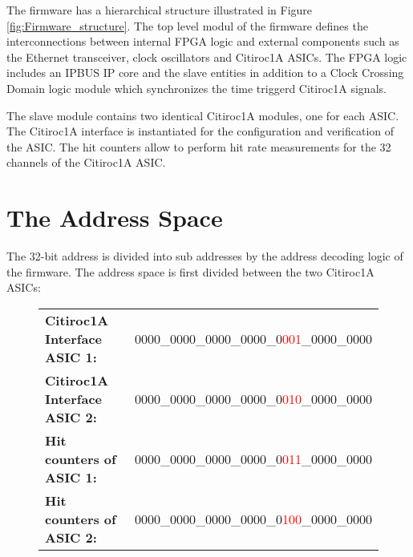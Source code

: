 The firmware has a hierarchical structure illustrated in Figure \ref{fig:Firmware_structure}. 
\newline
The top level modul of the firmware defines the interconnections between internal FPGA logic and external components such as the Ethernet transceiver, clock oscillators and Citiroc1A ASICs.
\newline
The FPGA logic includes an IPBUS IP core and the slave entities in addition to a Clock Crossing Domain logic module which synchronizes the time triggerd Citiroc1A signals. 
\newline

The slave module contains two identical Citiroc1A modules, one for each ASIC. The Citiroc1A interface is instantiated for the configuration and verification of the ASIC.
The hit counters allow to perform hit rate measurements for the 32 channels of the Citiroc1A ASIC. 
\section{The Address Space}
The 32-bit address is divided into sub addresses by the address decoding logic of the firmware.
\newline
The address space is first divided between the two Citiroc1A ASICs:
\begin{figure}[H]
    \centering
\begin{tabular}{p{7cm} l}
    \textbf{Citiroc1A Interface ASIC 1:} & 0000\_0000\_0000\_0000\_0\textcolor{red}{001}\_0000\_0000 \\
    \textbf{Citiroc1A Interface ASIC 2:} & 0000\_0000\_0000\_0000\_0\textcolor{red}{010}\_0000\_0000 \\
    \textbf{Hit counters of ASIC 1:} & 0000\_0000\_0000\_0000\_0\textcolor{red}{011}\_0000\_0000 \\
    \textbf{Hit counters of ASIC 2: } & 0000\_0000\_0000\_0000\_0\textcolor{red}{100}\_0000\_0000\\
\end{tabular}
\end{figure}

